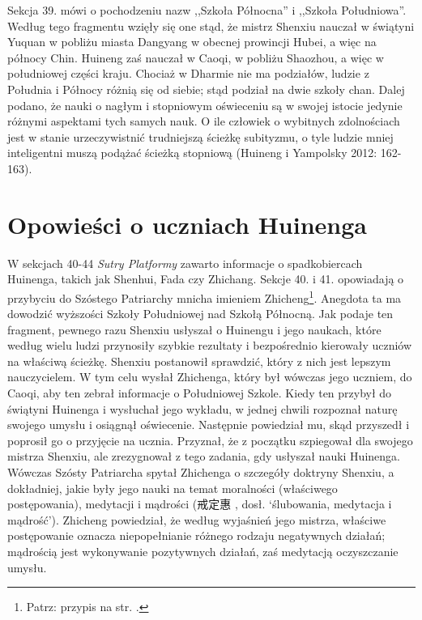 Sekcja 39. mówi o pochodzeniu nazw ,,Szkoła Północna'' i ,,Szkoła Południowa''.
Według tego fragmentu wzięły się one stąd, że mistrz Shenxiu nauczał w świątyni Yuquan w pobliżu miasta Dangyang w obecnej prowincji Hubei, a więc na północy Chin.
Huineng zaś nauczał w Caoqi, w pobliżu Shaozhou, a więc w południowej części kraju.
Chociaż w Dharmie nie ma podziałów, ludzie z Południa i Północy różnią się od siebie; stąd podział na dwie szkoły chan.
Dalej podano, że nauki o nagłym i stopniowym oświeceniu są w swojej istocie jedynie różnymi aspektami tych samych nauk.
O ile człowiek o wybitnych zdolnościach jest w stanie urzeczywistnić trudniejszą ścieżkę subityzmu, o tyle ludzie mniej inteligentni muszą podążać ścieżką stopniową
(Huineng i Yampolsky 2012: 162-163).

\section{Opowieści o uczniach Huinenga}
W sekcjach 40-44 \textit{Sutry Platformy} zawarto informacje o spadkobiercach Huinenga, takich jak Shenhui, Fada czy Zhichang. Sekcje 40. i 41. opowiadają o przybyciu do Szóstego Patriarchy mnicha imieniem Zhicheng\footnote{Patrz: przypis na str. \pageref{ZhiChangChengDisambiguation}.}.
Anegdota ta ma dowodzić wyższości Szkoły Południowej nad Szkołą Północną.
Jak podaje ten fragment, pewnego razu Shenxiu usłyszał o Huinengu i jego naukach, które według wielu ludzi przynosiły szybkie rezultaty i bezpośrednio kierowały uczniów na właściwą ścieżkę. %
Shenxiu postanowił sprawdzić, który z nich jest lepszym nauczycielem.
W tym celu wysłał Zhichenga, który był wówczas jego uczniem, do Caoqi, aby ten zebrał informacje o Południowej Szkole.
Kiedy ten przybył do świątyni Huinenga i wysłuchał jego wykładu, w jednej chwili rozpoznał naturę swojego umysłu i osiągnął oświecenie.
Następnie powiedział mu, skąd przyszedł i poprosił go o przyjęcie na ucznia.
Przyznał, że z początku szpiegował dla swojego mistrza Shenxiu, ale zrezygnował z tego zadania, gdy usłyszał nauki Huinenga.
Wówczas Szósty Patriarcha spytał Zhichenga o szczegóły doktryny Shenxiu, a dokładniej, jakie były jego nauki na temat moralności (właściwego postępowania), medytacji i mądrości (戒定惠 , dosł. `ślubowania, medytacja i mądrość').
Zhicheng powiedział, że według wyjaśnień jego mistrza, właściwe postępowanie oznacza niepopełnianie różnego rodzaju negatywnych działań; mądrością jest wykonywanie pozytywnych działań, zaś medytacją oczyszczanie umysłu.
